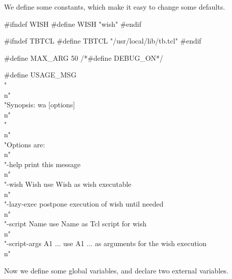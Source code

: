 
We define some constants, which make it easy to change some defaults.

\nwenddocs{}\endmoddef\let\nwnotused=\nwoutput{}\nwstartdeflinemarkup{}\nwenddeflinemarkup
#ifndef WISH
#define WISH    "wish"
#endif

#ifndef TBTCL
#define TBTCL   "/usr/local/lib/tb.tcl"
#endif

#define MAX_ARG 50
/*#define DEBUG_ON*/

#define USAGE_MSG \\
   "\\n" \\
   "Synopsis: wa [options]\\n" \\
   "\\n" \\
   "Options are:\\n" \\
   "-help                 print this message\\n" \\
   "-wish Wish            use Wish as wish executable\\n" \\
   "-lazy-exec            postpone execution of wish until needed\\n" \\
   "-script Name          use Name as Tcl script for wish\\n" \\
   "-script-args A1 ...   use A1 ... as arguments for the wish execution\\n"
\nwendcode{}\nwdocspar


Now we define some global variables, and declare two external variables.

